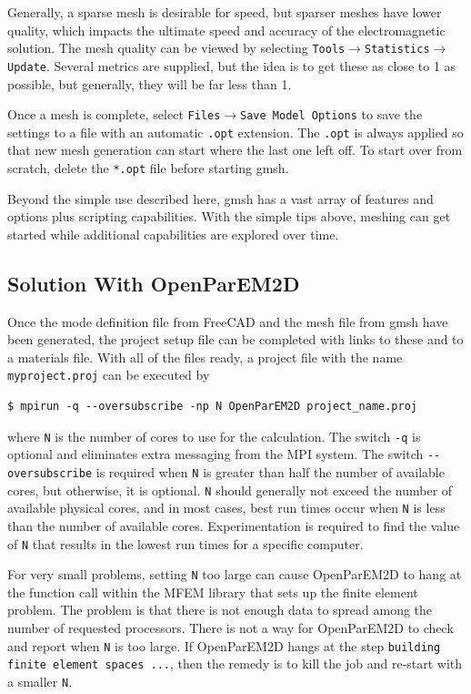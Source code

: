 \documentclass[titlepage]{article}
\renewcommand\_{\textunderscore\linebreak[1]}
\begin{document}
Generally, a sparse mesh is desirable for speed, but sparser meshes have lower quality, which impacts the ultimate speed and accuracy of the electromagnetic solution.  The mesh quality can be viewed by selecting \texttt{Tools}$\rightarrow$\texttt{Statistics}$\rightarrow$\texttt{Update}.  Several metrics are supplied, but the idea is to get these as close to 1 as possible, but generally, they will be far less than 1. 

Once a mesh is complete, select  \texttt{Files}$\rightarrow$\texttt{Save Model Options} to save the settings to a file with an automatic \texttt{.opt} extension.  The \texttt{.opt} is always applied so that new mesh generation can start where the last one left off.  To start over from scratch, delete the \texttt{*.opt} file before starting gmsh.

Beyond the simple use described here, gmsh has a vast array of features and options plus scripting capabilities. With the simple tips above, meshing can get started while additional capabilities are explored over time.

\subsection{Solution With OpenParEM2D}
\label{sec:solution}

Once the mode definition file from FreeCAD and the mesh file from gmsh have been generated, the project setup file can be completed with links to these and to a materials file.  With all of the files ready, a project file with the name \texttt{my\_project.proj} can be executed by 
\begin{Verbatim}[fontsize=\small]
   $ mpirun -q --oversubscribe -np N OpenParEM2D project_name.proj
\end{Verbatim}
where \verb+N+ is the number of cores to use for the calculation.  The switch \verb+-q+ is optional and eliminates extra messaging from the MPI system.  The switch \verb+--oversubscribe+ is required when \verb+N+ is greater than half the number of available cores, but otherwise, it is optional.  \verb+N+ should generally not exceed the number of available physical cores, and in most cases, best run times occur when \verb+N+ is less than the number of available cores.  Experimentation is required to find the value of \verb+N+ that results in the lowest run times for a specific computer.

For very small problems, setting \verb+N+ too large can cause OpenParEM2D to hang at the function call within the MFEM library that sets up the finite element problem.  The problem is that there is not enough data to spread among the number of requested processors.  There is not a way for OpenParEM2D to check and report when \verb+N+ is too large.  If OpenParEM2D hangs at the step \texttt{building finite element spaces ...}, then the remedy is to kill the job and re-start with a smaller \verb+N+.
\end{document}
